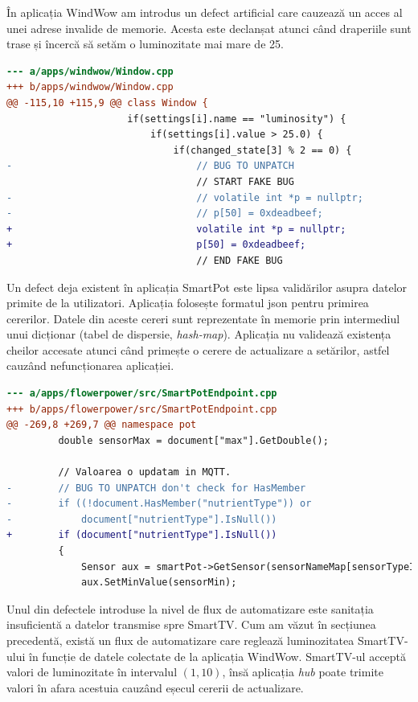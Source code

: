 În aplicația WindWow am introdus un defect artificial care cauzează un acces al unei adrese invalide de memorie. Acesta este declanșat atunci când draperiile sunt trase și încercă să setăm o luminozitate mai mare de 25.

\begin{lstlisting}[language=diff, caption={Accesarea adresei nule va cauza oprirea aplicației WindWow}]
--- a/apps/windwow/Window.cpp
+++ b/apps/windwow/Window.cpp
@@ -115,10 +115,9 @@ class Window {
                     if(settings[i].name == "luminosity") {
                         if(settings[i].value > 25.0) {
                             if(changed_state[3] % 2 == 0) {
-                                // BUG TO UNPATCH
                                 // START FAKE BUG
-                                // volatile int *p = nullptr;
-                                // p[50] = 0xdeadbeef;
+                                volatile int *p = nullptr;
+                                p[50] = 0xdeadbeef;
                                 // END FAKE BUG
\end{lstlisting}

Un defect deja existent în aplicația SmartPot este lipsa validărilor asupra datelor primite de la utilizatori. Aplicația folosește formatul \acrshort{json} pentru primirea cererilor. Datele din aceste cereri sunt reprezentate în memorie prin intermediul unui dicționar (tabel de dispersie, \textit{hash-map}). Aplicația nu validează existența cheilor accesate atunci când primește o cerere de actualizare a setărilor, astfel cauzând nefuncționarea aplicației.

\begin{lstlisting}[language=diff, caption={Lipsa validării cheilor JSON în aplicația SmartPot}]
--- a/apps/flowerpower/src/SmartPotEndpoint.cpp
+++ b/apps/flowerpower/src/SmartPotEndpoint.cpp
@@ -269,8 +269,7 @@ namespace pot
         double sensorMax = document["max"].GetDouble();
 
         // Valoarea o updatam in MQTT.
-        // BUG TO UNPATCH don't check for HasMember
-        if ((!document.HasMember("nutrientType")) or
-            document["nutrientType"].IsNull())
+        if (document["nutrientType"].IsNull())
         {
             Sensor aux = smartPot->GetSensor(sensorNameMap[sensorTypeID]);
             aux.SetMinValue(sensorMin);
\end{lstlisting}

Unul din defectele introduse la nivel de flux de automatizare este sanitația insuficientă a datelor transmise spre SmartTV. Cum am văzut în secțiunea precedentă, există un flux de automatizare care reglează luminozitatea SmartTV-ului în funcție de datele colectate de la aplicația WindWow. SmartTV-ul acceptă valori de luminozitate în intervalul $(1, 10)$, însă aplicația \textit{hub} poate trimite valori în afara acestuia cauzând eșecul cererii de actualizare.

